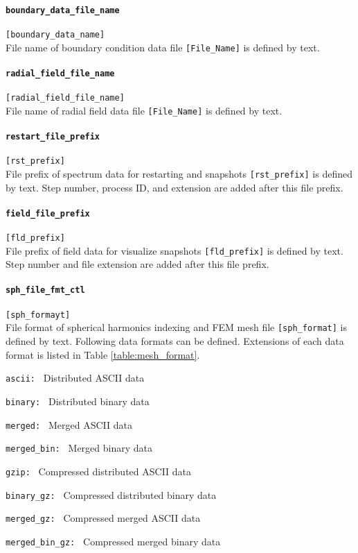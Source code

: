\paragraph{\tt boundary\_data\_file\_name}
\label{href_t:boundary_data_file_name}
\verb|[boundary_data_name]| \\
File name of boundary condition data file \verb|[File_Name]| is defined by text. 

\paragraph{\tt radial\_field\_file\_name}
\label{href_t:radial_field_file_name}
\verb|[radial_field_file_name]| \\
File name of radial field data file \verb|[File_Name]| is defined by text. 

\paragraph{\tt restart\_file\_prefix}
\label{href_t:restart_file_prefix}
\verb|[rst_prefix]| \\
File prefix of spectrum data for restarting and snapshots \verb|[rst_prefix]| is defined by text. Step number, process ID, and extension are added after this file prefix.

\paragraph{\tt field\_file\_prefix}
\label{href_t:field_file_prefix}
\verb|[fld_prefix]| \\
File prefix of field data for visualize snapshots \verb|[fld_prefix]| is defined by text. Step number and file extension are  added after this file prefix.

\paragraph{\tt sph\_file\_fmt\_ctl}
\label{href_t:sph_file_fmt_ctl}
\verb|[sph_formayt]| \\
File format of spherical harmonics indexing and FEM mesh file \verb|[sph_format]| is defined by text. Following data formats can be defined. Extensions of each data format is listed in Table \ref{table:mesh_format}.
%
\begin{description}
\item{\tt ascii: }   Distributed ASCII data
\item{\tt binary: }  Distributed binary data
\item{\tt merged: }  Merged ASCII data
\item{\tt merged\_bin: }   Merged binary data
\item{\tt gzip: }            Compressed distributed ASCII data
\item{\tt binary\_gz: }      Compressed distributed binary data
\item{\tt merged\_gz: }      Compressed merged ASCII data
\item{\tt merged\_bin\_gz: } Compressed merged binary data
\end{description}
%

